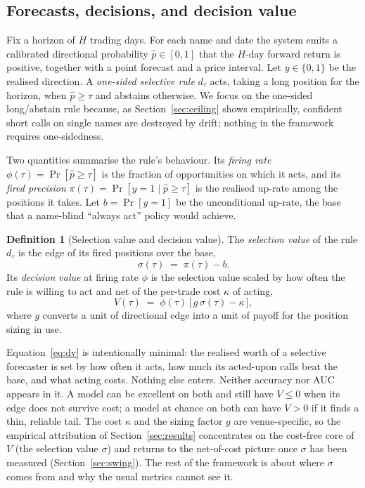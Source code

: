 \documentclass[10pt,a4paper,oneside]{article}
\theoremstyle{definition}
\newtheorem{definition}{Definition}
\theoremstyle{plain}
\newcommand{\Pup}{\hat p}
\begin{document}
\subsection{Forecasts, decisions, and decision value}
\label{sec:defs}
Fix a horizon of $H$ trading days. For each name and date the system emits a
calibrated directional probability $\Pup\in[0,1]$ that the $H$-day forward return is
positive, together with a point forecast and a price interval. Let $y\in\{0,1\}$ be
the realised direction. A \emph{one-sided selective rule} $d_\tau$ acts, taking a long
position for the horizon, when $\Pup\ge\tau$ and abstains otherwise. We focus on the
one-sided long/abstain rule because, as Section~\ref{sec:ceiling} shows empirically,
confident short calls on single names are destroyed by drift; nothing in the
framework requires one-sidedness.

Two quantities summarise the rule's behaviour. Its \emph{firing rate}
$\phi(\tau)=\Pr[\Pup\ge\tau]$ is the fraction of opportunities on which it acts, and
its \emph{fired precision} $\pi(\tau)=\Pr[y=1\mid \Pup\ge\tau]$ is the realised up-rate
among the positions it takes. Let $b=\Pr[y=1]$ be the unconditional up-rate, the
base that a name-blind ``always act'' policy would achieve.

\begin{definition}[Selection value and decision value]
\label{def:dv}
The \emph{selection value} of the rule $d_\tau$ is the edge of its fired positions
over the base,
\begin{equation}
\label{eq:sigma}
\sigma(\tau)\;=\;\pi(\tau)-b .
\end{equation}
Its \emph{decision value} at firing rate $\phi$ is the selection value scaled by how
often the rule is willing to act and net of the per-trade cost $\kappa$ of acting,
\begin{equation}
\label{eq:dv}
V(\tau)\;=\;\phi(\tau)\,\big[\,g\,\sigma(\tau)-\kappa\,\big],
\end{equation}
where $g$ converts a unit of directional edge into a unit of payoff for the position
sizing in use.
\end{definition}

Equation~\eqref{eq:dv} is intentionally minimal: the realised worth of a selective
forecaster is set by how often it acts, how much its acted-upon calls beat the base,
and what acting costs. Nothing else enters. Neither accuracy nor AUC appears in it.
A model can be excellent on both and still have $V\le 0$ when its edge does not
survive cost; a model at chance on both can have $V>0$ if it finds a thin, reliable
tail. The cost $\kappa$ and the sizing factor $g$ are venue-specific, so the
empirical attribution of Section~\ref{sec:results} concentrates on the cost-free core
of $V$ (the selection value $\sigma$) and returns to the net-of-cost picture once
$\sigma$ has been measured (Section~\ref{sec:swing}). The rest of the framework is
about where $\sigma$ comes from and why the usual metrics cannot see it.
\end{document}
